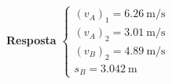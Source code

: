 
\textbf{Resposta}
$
\begin{cases}
	(v_{A})_{1}=\SI{6.26}{\meter/\second}\\
	(v_{A})_{2}=\SI{3.01}{\meter/\second}\\
	(v_{B})_{2}=\SI{4.89}{\meter/\second}\\
	s_{B}=\SI{3.042}{\meter}
\end{cases}
$